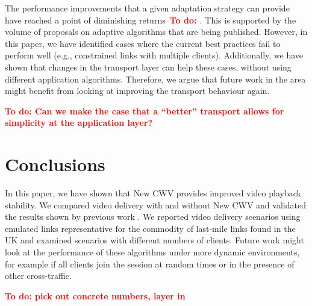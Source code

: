 \documentclass[10pt,sigconf,anonymous]{acmart}
\newcommand{\todo}[1]{\textbf{\textcolor{red}{To do: #1}}}
\begin{document}
The performance improvements that a given adaptation strategy can provide have reached a point of diminishing returns~\todo{\cite{..}}. This is supported by the volume of proposals on adaptive algorithms that are being published. However, in this paper, we have  identified cases where the current best practices fail to perform well (e.g., constrained links with multiple clients). Additionally, we have shown that changes in the transport layer can help these cases, without using different application algorithms. Therefore, we argue that future work in the area might benefit from looking at improving the transport behaviour again. 

\todo{Can we make the case that a ``better'' transport allows for simplicity at the application layer?}

\section{Conclusions}
\label{sec:conclusion}

In this paper, we have shown that New CWV provides improved video playback stability. We compared video delivery with and without New CWV and validated the results shown by previous work \cite{Nazir-2014-performance-evaluation-congestion-window-validation-dash-newcwv}. We reported video delivery scenarios using emulated links representative for the commodity of last-mile links found in the UK and examined scenarios with different numbers of clients. Future work might look at the performance of these algorithms under more dynamic environments, for example if all clients join the session at random times or in the presence of other cross-traffic. 

\todo{pick out concrete numbers, layer in}



%
\end{document}
